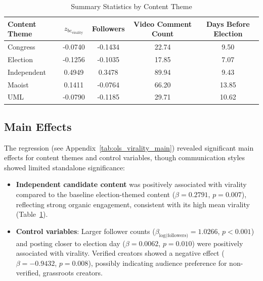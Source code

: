 \documentclass[12pt,a4paper]{report}
\begin{document}
\begin{table}[ht]
\centering
\caption{Summary Statistics by Content Theme}
\scriptsize
\label{tab:summary_stats}
\begin{tabular}{lcccc}
\toprule
\textbf{Content Theme} & \textbf{$z_{bc_{\text{virality}}}$} & \textbf{Followers} & \textbf{Video Comment Count} & \textbf{Days Before Election} \\
\midrule
Congress & -0.0740 & -0.1434 & 22.74 & 9.50 \\
Election & -0.1256 & -0.1035 & 17.85 & 7.07 \\
Independent & 0.4949 & 0.3478 & 89.94 & 9.43 \\
Maoist & 0.1411 & -0.0764 & 66.20 & 13.85 \\
UML & -0.0790 & -0.1185 & 29.71 & 10.62 \\
\bottomrule
\end{tabular}
\end{table}
\newpage
\subsection{Main Effects}
The regression (see Appendix~\ref{tab:ols_virality_main}) revealed significant main effects for content themes and control variables, though communication styles showed limited standalone significance:
\begin{itemize}[noitemsep]
    \item \textbf{Independent candidate content} was positively associated with virality compared to the baseline election-themed content ($\beta = 0.2791$, $p = 0.007$), reflecting strong organic engagement, consistent with its high mean virality (Table~\ref{tab:summary_stats}).
    \item \textbf{Control variables}: Larger follower counts ($\beta_{\text{log(followers)}} = 1.0266$, $p < 0.001$) and posting closer to election day ($\beta = 0.0062$, $p = 0.010$) were positively associated with virality. Verified creators showed a negative effect ($\beta = -0.9432$, $p = 0.008$), possibly indicating audience preference for non-verified, grassroots creators.
\end{itemize}
\end{document}
